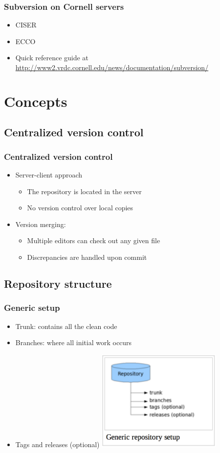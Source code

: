 \documentclass{beamer}
\begin{document}
\frame
{
  \frametitle{Subversion on Cornell servers}
  
  \begin{itemize}
  \item CISER
  \item ECCO
  \item Quick reference guide at \url{http://www2.vrdc.cornell.edu/news/documentation/subversion/}
  \end{itemize}

}

\section{Concepts}

\subsection{Centralized version control}


\frame
{
  \frametitle{Centralized version control}
  
  \begin{itemize}
  \item<1-> Server-client approach
  	\begin{itemize}
	\item<1-> The repository is located in the server
	\item<1-> No version control over local copies
	\end{itemize}
  \item<3-> Version merging:
  	\begin{itemize}
  	\item<2-> Multiple editors can check out any given file
	\item<2-> Discrepancies are handled upon commit
	\end{itemize}
  \end{itemize}
  
}

\subsection{Repository structure}

\frame
{
  \frametitle{Generic setup}
  
  \begin{itemize}
  \item<1-> Trunk: contains all the clean code
  \item<1-> Branches: where all initial work occurs
  \item<1-> Tags and releases (optional)
  \includegraphics[height=5cm]{repo_structure.png}
  \end{itemize}

}
\end{document}

